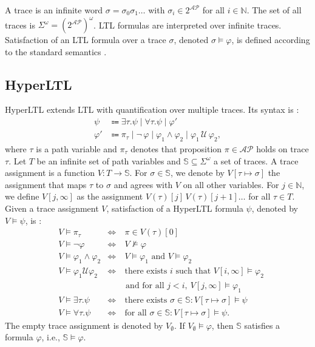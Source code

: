 \documentclass[letterpaper, 10 pt, conference]{ieeeconf}  %
\begin{document}
A trace is an infinite word $\sigma = \sigma_0 \sigma_1 \dots$ with $\sigma_i \in 2^\mathcal{AP}$ for all $i \in \mathbb{N}$. The set of all traces is $\Sigma^\omega = (2^\mathcal{AP})^\omega$. LTL formulas are interpreted over infinite traces. Satisfaction of an LTL formula over a trace $\sigma$, denoted $\sigma \models \varphi$, is defined according to the standard semantics \cite{baier2008}.

\subsection{HyperLTL} \label{subsec:hyperltl}
HyperLTL extends LTL with quantification over multiple traces. Its syntax is \cite{clarkson2014}:
\begin{equation*} \label{eq:hyperltl}
    \begin{aligned}
        \psi &\Coloneqq \exists \tau. \psi \mid \forall \tau .  \psi \mid \varphi' \\
        \varphi' &\Coloneqq \pi_\tau \mid \lnot \, \varphi \mid \varphi_1 \land \varphi_2 \mid \varphi_1 \, \mathcal{U} \, \varphi_2,
    \end{aligned}
\end{equation*}
where $\tau$ is a path variable and $\pi_\tau$ denotes that proposition $\pi \in \mathcal{AP}$ holds on trace $\tau$. Let $T$ be an infinite set of path variables and $\mathbb{S} \subseteq \Sigma^\omega$ a set of traces. A trace assignment is a function $V: T \to \mathbb{S}$. For $\sigma \in \mathbb{S}$, we denote by $V[\tau \mapsto \sigma]$ the assignment that maps $\tau$ to $\sigma$ and agrees with $V$ on all other variables. For $j \in \mathbb{N}$, we define $V[j, \infty]$ as the assignment $V(\tau)[j] \, V(\tau)[j+1] \dots$ for all $\tau \in T$. Given a trace assignment $V$, satisfaction of a HyperLTL formula $\psi$, denoted by $V \models \psi$, is \cite{clarkson2014}:
\begin{equation*}
    \begin{aligned}
        &V \models \pi_\tau &\Leftrightarrow& \ \pi \in V(\tau)[0] \\
        &V \models \neg \varphi &\Leftrightarrow& \ V \not\models \varphi \\
        &V \models \varphi_1 \land \varphi_2 &\Leftrightarrow&  \ V \models \varphi_1 \text{ and }  V \models \varphi_2 \\
        &V \models \varphi_1 \mathcal{U} \varphi_2 &\Leftrightarrow& \ \text{there exists } i \text{ such that } V[i, \infty] \models \varphi_2 \\
        & & & \text{ and for all } j < i, \  V[j, \infty] \models \varphi_1 \\
        &V \models \exists \tau. \psi &\Leftrightarrow& \ \text{there exists } \sigma \in \mathbb{S}: V[\tau \mapsto \sigma] \models \psi \\
        &V \models \forall \tau. \psi &\Leftrightarrow& \ \text{for all } \sigma \in \mathbb{S}:  V[\tau \mapsto \sigma] \models \psi.
    \end{aligned}
\end{equation*}
The empty trace assignment is denoted by $V_\emptyset$. If $V_\emptyset \models \varphi$, then $\mathbb{S}$ satisfies a formula $\varphi$, i.e., $\mathbb{S} \models \varphi$.
\end{document}

